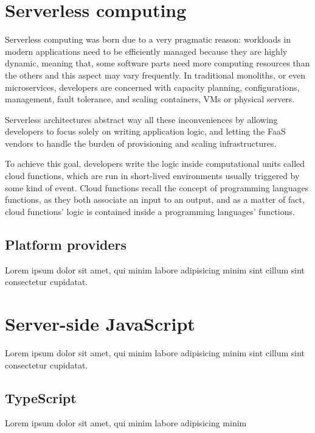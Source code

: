 \section{Serverless computing}

Serverless computing was born due to a very pragmatic reason:
workloads in modern applications need to be efficiently managed
because they are highly dynamic, meaning that, some software parts
need more computing resources than the others and this aspect may vary frequently.
In traditional monoliths, or even microservices, developers are concerned
with capacity planning, configurations, management, fault tolerance, and
scaling containers, VMs or physical servers.

Serverless architectures abstract way all these inconveniences
by allowing developers to focus solely on writing application logic,
and letting the FaaS vendors to handle the burden of provisioning and scaling infrastructures.

To achieve this goal, developers write the logic inside computational units
called cloud functions, which are run in short-lived environments usually triggered by some kind of event.
Cloud functions recall the concept of programming languages functions,
as they both associate an input to an output, and as a matter of fact, 
cloud functions' logic is contained inside a programming languages' functions.

\subsection{Platform providers}

Lorem ipsum dolor sit amet, qui minim labore adipisicing minim sint cillum sint consectetur cupidatat.

\section{Server-side JavaScript}

Lorem ipsum dolor sit amet, qui minim labore adipisicing minim sint cillum sint consectetur cupidatat.

\subsection{TypeScript}

Lorem ipsum dolor sit amet, qui minim labore adipisicing minim
